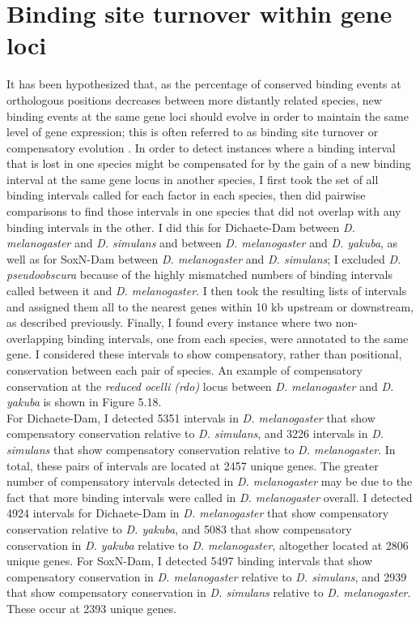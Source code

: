 \section{Binding site turnover within gene loci}
It has been hypothesized that, as the percentage of conserved binding events at orthologous positions decreases between more distantly related species, new binding events at the same gene loci should evolve in order to maintain the same level of gene expression; this is often referred to as binding site turnover or compensatory evolution \cite{arnold_quantitative_2014,bradley_binding_2010,he_does_2011,moses_large-scale_2006}. In order to detect instances where a binding interval that is lost in one species might be compensated for by the gain of a new binding interval at the same gene locus in another species, I first took the set of all binding intervals called for each factor in each species, then did pairwise comparisons to find those intervals in one species that did not overlap with any binding intervals in the other. I did this for Dichaete-Dam between \emph{D. melanogaster} and \emph{D. simulans} and between \emph{D. melanogaster} and \emph{D. yakuba}, as well as for SoxN-Dam between \emph{D. melanogaster} and \emph{D. simulans}; I excluded \emph{D. pseudoobscura} because of the highly mismatched numbers of binding intervals called between it and \emph{D. melanogaster}. I then took the resulting lists of intervals and assigned them all to the nearest genes within 10 kb upstream or downstream, as described previously. Finally, I found every instance where two non-overlapping binding intervals, one from each species, were annotated to the same gene. I considered these intervals to show compensatory, rather than positional, conservation between each pair of species. An example of compensatory conservation at the \emph{reduced ocelli (rdo)} locus between \emph{D. melanogaster} and \emph{D. yakuba} is shown in Figure 5.18.\\ 

For Dichaete-Dam, I detected 5351 intervals in \emph{D. melanogaster} that show compensatory conservation relative to \emph{D. simulans}, and 3226 intervals in \emph{D. simulans} that show compensatory conservation relative to \emph{D. melanogaster}. In total, these pairs of intervals are located at 2457 unique genes. The greater number of compensatory intervals detected in \emph{D. melanogaster} may be due to the fact that more binding intervals were called in \emph{D. melanogaster} overall. I detected 4924 intervals for Dichaete-Dam in \emph{D. melanogaster} that show compensatory conservation relative to \emph{D. yakuba}, and 5083 that show compensatory conservation in \emph{D. yakuba} relative to \emph{D. melanogaster}, altogether located at 2806 unique genes. For SoxN-Dam, I detected 5497 binding intervals that show compensatory conservation in \emph{D. melanogaster} relative to \emph{D. simulans}, and 2939 that show compensatory conservation in \emph{D. simulans} relative to \emph{D. melanogaster}. These occur at 2393 unique genes.\\

